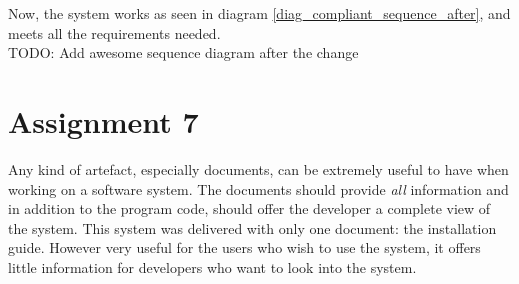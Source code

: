 \documentclass[12pt]{article}
\begin{document}
Now, the system works as seen in diagram \ref{diag_compliant_sequence_after}, and meets all the requirements needed.
\\
TODO: Add awesome sequence diagram after the change


\section*{Assignment 7}
Any kind of artefact, especially documents, can be extremely useful to have when working on a software system. The documents should provide \emph{all} information and in addition to the program code, should offer the developer a complete view of the system. This system was delivered with only one document: the installation guide. However very useful for the users who wish to use the system, it offers little information for developers who want to look into the system.
\end{document}
